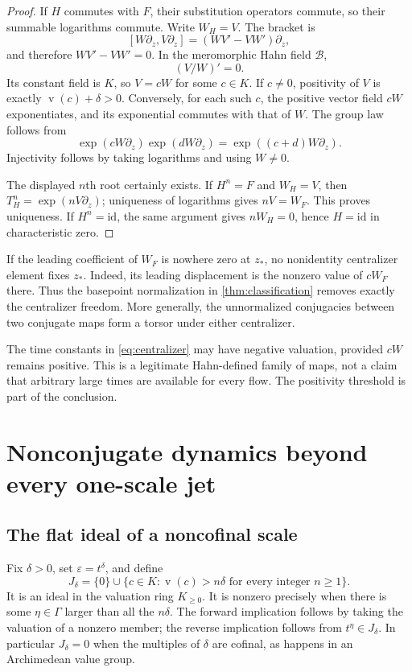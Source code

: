 \documentclass[11pt,a4paper]{article}
\numberwithin{equation}{section}
\theoremstyle{definition}
\theoremstyle{remark}
\newcommand{\eps}{\varepsilon}
\newcommand{\id}{\mathrm{id}}
\newcommand{\val}{\operatorname{v}}
\begin{document}
\begin{proof}
If $H$ commutes with $F$, their substitution operators commute, so their
summable logarithms commute.  Write $W_H=V$.  The bracket is
\[
 [W\partial_z,V\partial_z]=(WV'-VW')\partial_z,
\]
and therefore $WV'-VW'=0$.  In the meromorphic Hahn field $\mathcal B$,
\[
 (V/W)'=0.
\]
Its constant field is $K$, so $V=cW$ for some $c\in K$.
If $c\ne0$, positivity of $V$ is exactly
$\val(c)+\delta>0$.  Conversely, for each such $c$, the positive vector
field $cW$ exponentiates, and its exponential commutes with that of $W$.
The group law follows from
\[
 \exp(cW\partial_z)\exp(dW\partial_z)
     =\exp((c+d)W\partial_z).
\]
Injectivity follows by taking logarithms and using $W\ne0$.

The displayed $n$th root certainly exists.  If $H^n=F$ and $W_H=V$,
then $T_H^n=\exp(nV\partial_z)$; uniqueness of logarithms gives
$nV=W_F$.  This proves uniqueness.  If $H^n=\id$, the same argument gives
$nW_H=0$, hence $H=\id$ in characteristic zero.
\end{proof}

If the leading coefficient of $W_F$ is nowhere zero at $z_*$, no
nonidentity centralizer element fixes $z_*$.  Indeed, its leading
displacement is the nonzero value of $cW_F$ there.  Thus the basepoint
normalization in \cref{thm:classification} removes exactly the
centralizer freedom.  More generally, the unnormalized conjugacies between
two conjugate maps form a torsor under either centralizer.

The time constants in \eqref{eq:centralizer} may have negative valuation,
provided $cW$ remains positive.  This is a legitimate Hahn-defined family
of maps, not a claim that arbitrary large times are available for every
flow.  The positivity threshold is part of the conclusion.

\section{Nonconjugate dynamics beyond every one-scale jet}
\label{sec:flat}

\subsection{The flat ideal of a noncofinal scale}

Fix $\delta>0$, set $\eps=t^\delta$, and define
\begin{equation}\label{eq:flat-ideal}
 J_\delta=\{0\}\cup
 \{c\in K:\val(c)>n\delta\text{ for every integer }n\geq1\}.
\end{equation}
It is an ideal in the valuation ring $K_{\geq0}$.  It is nonzero precisely
when there is some $\eta\in\Gamma$ larger than all the $n\delta$.
The forward implication follows by taking the valuation of a nonzero
member; the reverse implication follows from $t^\eta\in J_\delta$.
In particular $J_\delta=0$ when the multiples of $\delta$ are cofinal,
as happens in an Archimedean value group.
\end{document}
